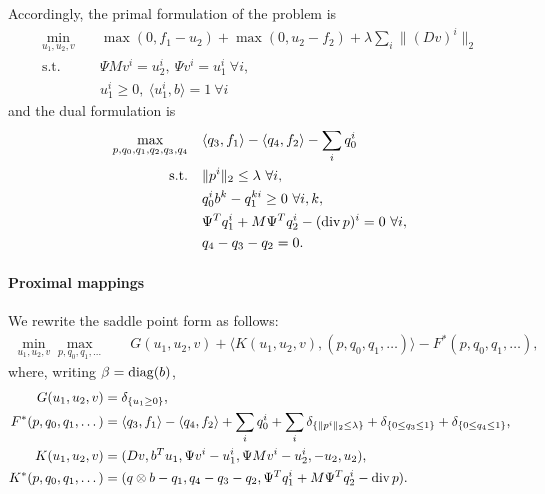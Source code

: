 Accordingly, the primal formulation of the problem is
\begin{align*}
    \min_{u_1,u_2,v} \quad
        & \max(0, f_1 - u_2) + \max(0, u_2 - f_2)
            + \lambda \sum_{i} \| (D v)^{i} \|_{2} \\
    \text{s.t.}\quad 
        & \Psi M v^i = u_2^i, ~\Psi v^i = u_1^i ~\forall i, \\
        & u_1^i \geq 0, ~\langle u_1^i, b \rangle = 1 ~\forall i
\end{align*}
and the dual formulation is
\begin{align*}
    \max_{p,q_0,q_1,q_2,q_3,q_4} \quad
        & \langle q_3, f_1 \rangle - \langle q_4, f_2 \rangle - \sum_i q_0^i  \\
    \text{s.t.}\quad 
        & \|p^{i}\|_{2} \leq \lambda ~\forall i, \\
        & q_0^i b^k - q_1^{ki} \geq 0 ~\forall i, k, \\
        & \Psi^T q_1^i + M \Psi^T q_2^i - (\operatorname{div} p)^i = 0 ~\forall i, \\
        & q_4 - q_3 - q_2 = 0.
\end{align*}

\paragraph{Proximal mappings}

We rewrite the saddle point form as follows:
\begin{align*}
    \min_{u_1,u_2,v} \max_{p,q_0,q_1,\dots} \quad
        & G(u_1,u_2,v) + \langle K(u_1,u_2,v), (p,q_0,q_1,\dots) \rangle - F^*(p,q_0,q_1,\dots),
\end{align*}
where, writing $\beta = \operatorname{diag}(b)$,
\begin{align*}
    G(u_1,u_2,v) &= \delta_{\{u_1 \geq 0\}}, \\
    F^*(p,q_0,q_1,\dots) &= \langle q_3, f_1 \rangle - \langle q_4, f_2 \rangle
        + \sum_{i} q_0^i 
        + \sum_{i} \delta_{\{\|p^{i}\|_{2} \leq \lambda\}}
        + \delta_{\{0 \leq q_3 \leq 1\}} + \delta_{\{0 \leq q_4 \leq 1\}}, \\
    K(u_1,u_2,v) &= (
        Dv,
        b^T u_1,
        \Psi v^i - u_1^i,
        \Psi M v^i - u_2^i,
        -u_2,
        u_2
    ), \\
    K^*(p,q_0,q_1,\dots) &= (
        q \otimes b - q_1,
        q_4 - q_3 - q_2,
        \Psi^T q_1^i + M \Psi^T q_2^i - \operatorname{div}{p}
    ).
\end{align*}

